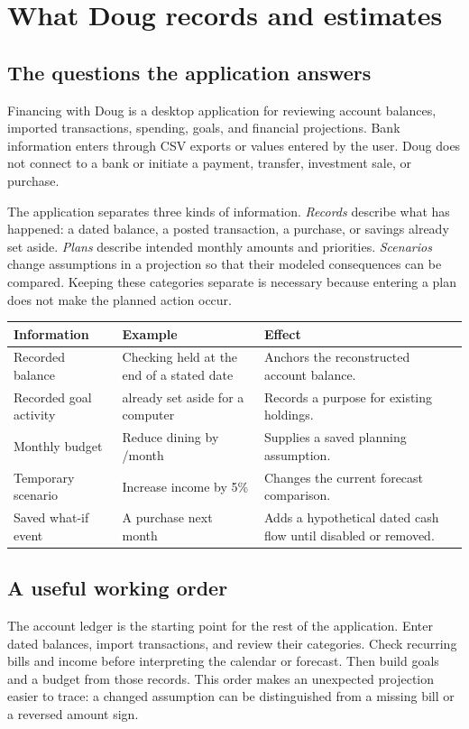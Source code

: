 \chapter{What Doug records and estimates}\label{ch:introduction}
\section{The questions the application answers}
Financing with Doug is a desktop application for reviewing account balances, imported transactions, spending, goals, and financial projections. Bank information enters through CSV exports or values entered by the user. Doug does not connect to a bank or initiate a payment, transfer, investment sale, or purchase.

The application separates three kinds of information. \emph{Records} describe what has happened: a dated balance, a posted transaction, a purchase, or savings already set aside. \emph{Plans} describe intended monthly amounts and priorities. \emph{Scenarios} change assumptions in a projection so that their modeled consequences can be compared. Keeping these categories separate is necessary because entering a plan does not make the planned action occur.

\begin{tabularx}{\textwidth}{@{}p{}YY@{}}
\toprule Information & Example & Effect\\\midrule
Recorded balance & Checking held  at the end of a stated date & Anchors the reconstructed account balance.\\
Recorded goal activity &  already set aside for a computer & Records a purpose for existing holdings.\\
Monthly budget & Reduce dining by /month & Supplies a saved planning assumption.\\
Temporary scenario & Increase income by 5\% & Changes the current forecast comparison.\\
Saved what-if event & A  purchase next month & Adds a hypothetical dated cash flow until disabled or removed.\\
\bottomrule
\end{tabularx}

\section{A useful working order}
The account ledger is the starting point for the rest of the application. Enter dated balances, import transactions, and review their categories. Check recurring bills and income before interpreting the calendar or forecast. Then build goals and a budget from those records. This order makes an unexpected projection easier to trace: a changed assumption can be distinguished from a missing bill or a reversed amount sign.

